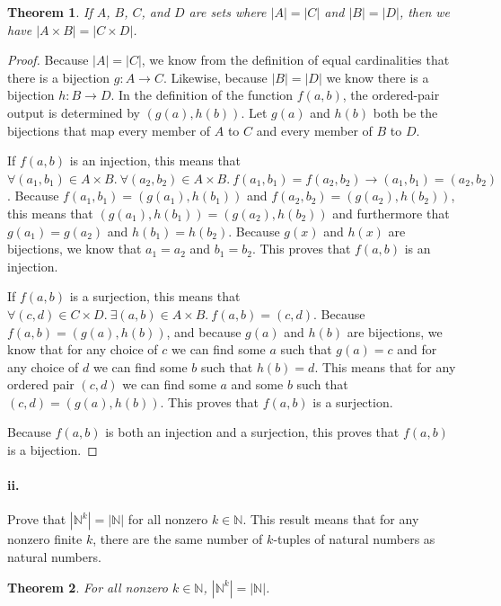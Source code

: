\documentclass[10pt,letter]{article}
\newtheorem*{thm}{Theorem}
\begin{document}
\begin{thm} If $A$, $B$, $C$, and $D$ are sets where $|A| = |C|$ and $|B| = |D|$, then we have $|A \times B| = |C \times D|$. 
\end{thm}

\begin{proof} Because $|A| = |C|$, we know from the definition of equal cardinalities that there is a bijection $g: A \rightarrow C$. Likewise, because $|B| = |D|$ we know there is a bijection $h: B \rightarrow D$. In the definition of the function $f(a, b)$, the ordered-pair output is determined by $(g(a), h(b))$. Let $g(a)$ and $h(b)$ both be the bijections that map every member of $A$ to $C$ and every member of $B$ to $D$. 

If $f(a, b)$ is an injection, this means that $\forall (a_1, b_1) \in A \times B .\ \forall (a_2, b_2) \in A \times B .\ f(a_1, b_1) = f(a_2, b_2) \rightarrow (a_1, b_1) = (a_2, b_2)$. Because $f(a_1, b_1) = (g(a_1), h(b_1))$ and $f(a_2, b_2) = (g(a_2), h(b_2))$, this means that $(g(a_1), h(b_1)) = (g(a_2), h(b_2))$ and furthermore that $g(a_1) = g(a_2)$ and $h(b_1) = h(b_2)$. Because $g(x)$ and $h(x)$ are bijections, we know that $a_1 = a_2$ and $b_1 = b_2$. This proves that $f(a, b)$ is an injection.

If $f(a, b)$ is a surjection, this means that $\forall (c, d) \in C \times D .\ \exists (a, b) \in A \times B .\ f(a, b) = (c, d)$. Because $f(a, b) = (g(a), h(b))$, and because $g(a)$ and $h(b)$ are bijections, we know that for any choice of $c$ we can find some $a$ such that $g(a) = c$ and for any choice of $d$ we can find some $b$ such that $h(b) = d$. This means that for any ordered pair $(c, d)$ we can find some $a$ and some $b$ such that $(c, d) = (g(a), h(b))$. This proves that $f(a, b)$ is a surjection. 

Because $f(a, b)$ is both an injection and a surjection, this proves that $f(a, b)$ is a bijection.

\end{proof}

\paragraph{ii.} Prove that $|\mathbb{N}^k| = |\mathbb{N}|$ for all nonzero $k \in \mathbb{N}$. This result means that for any nonzero finite $k$, there are the same number of $k$-tuples of natural numbers as natural numbers.

\begin{thm} For all nonzero $k \in \mathbb{N}$, $|\mathbb{N}^k| = |\mathbb{N}|$. 
\end{thm}
\end{document}
